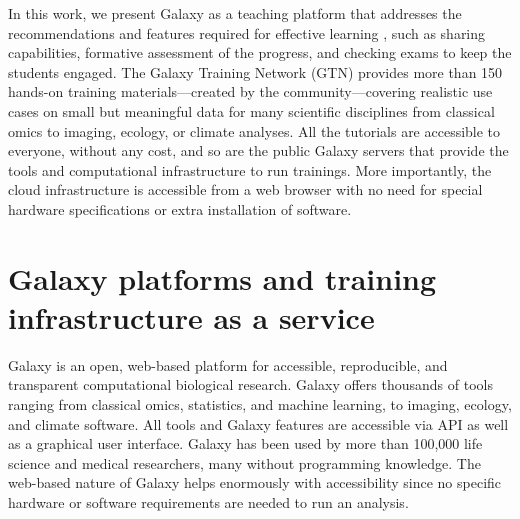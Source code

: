 In this work, we present Galaxy as a teaching platform that addresses the recommendations and features required for effective learning \cite{gallardo2021constructivist}, such as sharing capabilities, formative assessment of the progress, and checking exams to keep the students engaged. The Galaxy Training Network (GTN) \cite{Batut_2018} provides more than 150 hands-on training materials—created by the community—covering realistic use cases on small but meaningful data for many scientific disciplines from classical omics to imaging, ecology, or climate analyses. All the tutorials are accessible to everyone, without any cost, and so are the public Galaxy servers that provide the tools and computational infrastructure to run trainings. More importantly, the cloud infrastructure is accessible from a web browser with no need for special hardware specifications or extra installation of software.

\section*{Galaxy platforms and training infrastructure as a service}

Galaxy is an open, web-based platform for accessible, reproducible, and transparent computational biological research. Galaxy offers thousands of tools ranging from classical omics, statistics, and machine learning, to imaging, ecology, and climate software. All tools and Galaxy features are accessible via API as well as a graphical user interface. Galaxy has been used by more than 100,000 life science and medical researchers, many without programming knowledge. The web-based nature of Galaxy helps enormously with accessibility since no specific hardware or software requirements are needed to run an analysis.

